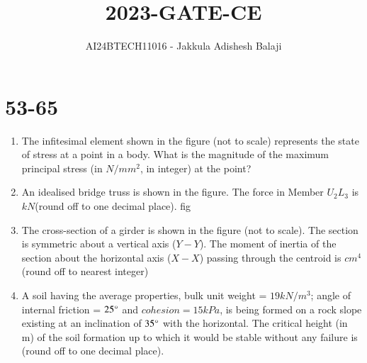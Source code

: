 \documentclass[journal]{IEEEtran}
\begin{document}

\title{2023-GATE-CE}
\author{AI24BTECH11016 - Jakkula Adishesh Balaji}
{\let\newpage\relax\maketitle}

\renewcommand{\thefigure}{\theenumi}
\renewcommand{\thetable}{\theenumi}
\setlength{\intextsep}{10pt} %
\section{53-65}
\begin{enumerate}
	\item
	The infitesimal element shown in the figure (not to scale) represents the state of stress at a point in a body. What is the magnitude of the maximum principal stress (in $N/mm^{2}$, in integer) at the point?
	\begin{figure}[H]
    		\centering
    		
    		\caption{}
    		\label{36}
	\end{figure}
	\item
	An idealised bridge truss is shown in the figure. The force in Member $U_{2}L_{3}$ is $kN$(round off to one decimal place).
	fig\begin{figure}[H]
    		\centering
    		
    		\caption{}
    		\label{36}
	\end{figure}
	\item 
	The cross-section of a girder is shown in the figure (not to scale). The section is symmetric about a vertical axis ($Y-Y$). The moment of inertia of the section about the horizontal axis ($X-X$) passing through the centroid is $cm^{4}$ (round off to nearest integer)
	\begin{figure}[H]
    		\centering
    		
    		\caption{}
    		\label{36}
	\end{figure}
	\item
	A soil having the average properties, bulk unit weight = $19 kN/m^{3}$; angle of internal friction = $25 \degree $ and $cohesion = 15 kPa$, is being formed on a rock slope existing at an inclination of $35 \degree $ with the horizontal. The critical height (in m) of the soil formation up to which it would be stable without any failure is (round off to one decimal place).
	\\
	[Assume the soil is being formed parallel to the rock bedding plane and there is no ground water effect.]

\end{enumerate}
\end{document}
